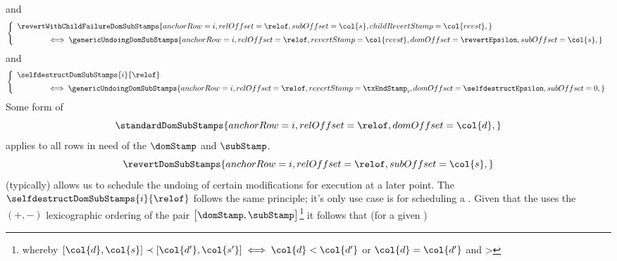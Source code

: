 and
\[
	\left\{ \begin{array}{l}
		\revertWithChildFailureDomSubStamps {
			anchorRow        = i           ,
			relOffset        = \relof      ,
			subOffset        = \col{s}     ,
			childRevertStamp = \col{revst} ,
		}
		\vspace{2mm} \\ \qquad \qquad \iff
		\genericUndoingDomSubStamps {
			anchorRow   = i              ,
			relOffset   = \relof         ,
			revertStamp = \col{revst}    ,
			domOffset   = \revertEpsilon ,
			subOffset   = \col{s}        ,
		}
	\end{array} \right.
\]
and
\[
	\left\{ \begin{array}{l}
		\selfdestructDomSubStamps {i}{\relof}
		\vspace{2mm} \\ \qquad \qquad \iff
		\genericUndoingDomSubStamps {
			anchorRow   = i                    ,
			relOffset   = \relof               ,
			revertStamp = \txEndStamp_{i}      ,
			domOffset   = \selfdestructEpsilon ,
			subOffset   = 0                    ,
		}
	\end{array} \right.
\]
Some form of 
\[ 
	\standardDomSubStamps {
		anchorRow = i       ,
		relOffset = \relof  ,
		domOffset = \col{d} ,
		}
\]
applies to all rows in need of the $\domStamp$ and $\subStamp$.
\[ 
\revertDomSubStamps {
	anchorRow = i       ,
	relOffset = \relof  ,
	subOffset = \col{s} ,
	}
\]
(typically) allows us to schedule the undoing of certain modifications for execution at a later point.
The $\selfdestructDomSubStamps{i}{\relof}$ follows the same principle; it's only use case is for scheduling a . \saNote{} Given that the \zkEvm{} uses the $(+,-)$ lexicographic ordering of the pair $\big[\domStamp, \subStamp\big]$\footnote{whereby $[\col{d}, \col{s}] \prec [\col{d'}, \col{s'}] \iff \col{d} < \col{d'}$ or $\col{d} = \col{d'}$ and  > } it follows that (for a given \hubStamp)
